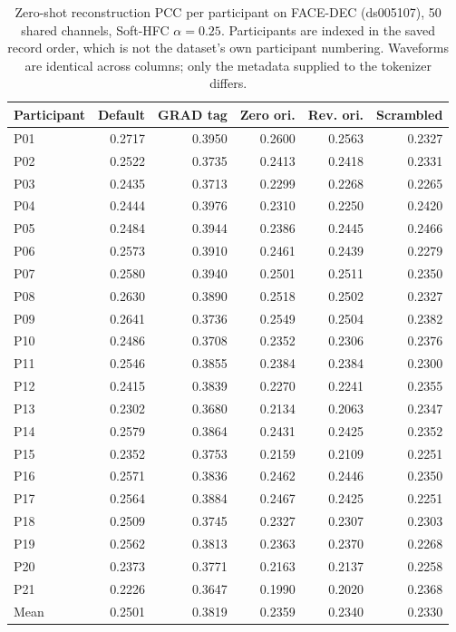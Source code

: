 \begin{table}[htbp]\centering\footnotesize
\setlength{\tabcolsep}{2.5pt}
\begin{tabular}{lrrrrr}
\toprule
Participant & Default & GRAD tag & Zero ori. & Rev. ori. & Scrambled \\
\midrule
P01 & 0.2717 & 0.3950 & 0.2600 & 0.2563 & 0.2327 \\
P02 & 0.2522 & 0.3735 & 0.2413 & 0.2418 & 0.2331 \\
P03 & 0.2435 & 0.3713 & 0.2299 & 0.2268 & 0.2265 \\
P04 & 0.2444 & 0.3976 & 0.2310 & 0.2250 & 0.2420 \\
P05 & 0.2484 & 0.3944 & 0.2386 & 0.2445 & 0.2466 \\
P06 & 0.2573 & 0.3910 & 0.2461 & 0.2439 & 0.2279 \\
P07 & 0.2580 & 0.3940 & 0.2501 & 0.2511 & 0.2350 \\
P08 & 0.2630 & 0.3890 & 0.2518 & 0.2502 & 0.2327 \\
P09 & 0.2641 & 0.3736 & 0.2549 & 0.2504 & 0.2382 \\
P10 & 0.2486 & 0.3708 & 0.2352 & 0.2306 & 0.2376 \\
P11 & 0.2546 & 0.3855 & 0.2384 & 0.2384 & 0.2300 \\
P12 & 0.2415 & 0.3839 & 0.2270 & 0.2241 & 0.2355 \\
P13 & 0.2302 & 0.3680 & 0.2134 & 0.2063 & 0.2347 \\
P14 & 0.2579 & 0.3864 & 0.2431 & 0.2425 & 0.2352 \\
P15 & 0.2352 & 0.3753 & 0.2159 & 0.2109 & 0.2251 \\
P16 & 0.2571 & 0.3836 & 0.2462 & 0.2446 & 0.2350 \\
P17 & 0.2564 & 0.3884 & 0.2467 & 0.2425 & 0.2251 \\
P18 & 0.2509 & 0.3745 & 0.2327 & 0.2307 & 0.2303 \\
P19 & 0.2562 & 0.3813 & 0.2363 & 0.2370 & 0.2268 \\
P20 & 0.2373 & 0.3771 & 0.2163 & 0.2137 & 0.2258 \\
P21 & 0.2226 & 0.3647 & 0.1990 & 0.2020 & 0.2368 \\
\midrule
Mean & 0.2501 & 0.3819 & 0.2359 & 0.2340 & 0.2330 \\
\bottomrule\end{tabular}
\caption{Zero-shot reconstruction PCC per participant on FACE-DEC (ds005107), 50 shared channels, Soft-HFC $\alpha=0.25$. Participants are indexed in the saved record order, which is not the dataset's own participant numbering. Waveforms are identical across columns; only the metadata supplied to the tokenizer differs.}
\label{tab:s-single-per-subject}\end{table}

